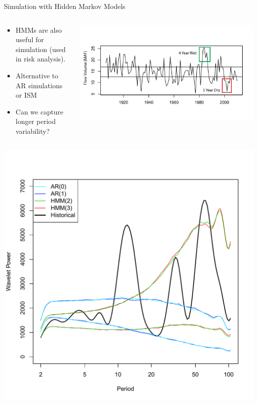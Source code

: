\documentclass[final,x11names]{beamer}
\begin{document}
\begin{frame}{}
\begin{columns}
\begin{column}{.33\linewidth}
		\begin{block}{Simulation with Hidden Markov Models}
		\begin{columns}
			\begin{column}{.48\textwidth}
				\begin{itemize}
					\item HMMs are also useful for simulation (used in risk analysis). 
					\item Alternative to AR simulations or ISM
					\item Can we capture longer period variability?
				\end{itemize}
			\end{column}
			\begin{column}{.48\textwidth}
				\includegraphics[width=\textwidth]{figs/lees-5yrdry.pdf}
			\end{column}
		\end{columns}
		
		\begin{columns}
			\begin{column}{.48\textwidth}
				\centerline{\includegraphics[width=\textwidth]{figs/spectrum.pdf}}


\end{column}
\end{columns}
\end{block}
\end{column}
\end{columns}
\end{frame}
\end{document}
